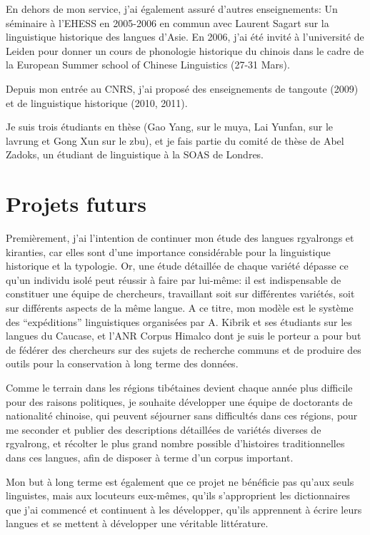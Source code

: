 \documentclass[oldfontcommands,oneside,a4paper,11pt]{memoir}
\begin{document}
En dehors de mon service, j’ai également assuré d’autres enseignements:
Un séminaire à l’EHESS en 2005-2006 en commun avec Laurent Sagart sur la linguistique historique des langues d’Asie.
En 2006, j’ai été invité à l’université de Leiden pour donner un cours de phonologie historique du chinois dans le cadre de la European Summer school of Chinese Linguistics (27-31 Mars).


Depuis mon entrée au CNRS, j'ai proposé des enseignements de tangoute (2009) et de linguistique historique (2010, 2011).

Je suis trois étudiants en thèse (Gao Yang, sur le muya, Lai Yunfan, sur le lavrung et Gong Xun sur le zbu), et je fais partie du comité de thèse de Abel Zadoks, un étudiant de linguistique à la SOAS de Londres.
 


\chapter{Projets futurs}


Premièrement, j'ai l'intention de continuer mon étude des langues rgyalrongs et kiranties, car elles sont d'une importance considérable pour la linguistique historique et la typologie. Or, une étude détaillée de chaque variété dépasse ce qu'un individu isolé peut réussir à faire par lui-même: il est indispensable de constituer une équipe de chercheurs, travaillant soit sur différentes variétés, soit sur différents aspects de la même langue. A ce titre, mon modèle est le système des ``expéditions'' linguistiques organisées par A. Kibrik et ses étudiants sur les langues du Caucase, et l'ANR Corpus Himalco dont je suis le porteur a pour but de fédérer des chercheurs sur des sujets de recherche communs et de produire des outils pour la conservation à long terme des données.

Comme le terrain dans les régions tibétaines devient chaque année plus difficile pour des raisons politiques, je souhaite développer une équipe de doctorants de nationalité chinoise, qui peuvent séjourner sans difficultés dans ces régions, pour me seconder et publier des descriptions détaillées de variétés diverses de rgyalrong, et récolter le plus grand nombre possible d'histoires traditionnelles dans ces langues, afin de disposer à terme d'un corpus important.

Mon but à long terme est également que ce projet ne bénéficie pas qu'aux seuls linguistes, mais aux locuteurs eux-mêmes, qu'ils s'approprient les  dictionnaires que j'ai commencé et continuent à les développer, qu'ils apprennent à écrire leurs langues et se mettent à développer une véritable littérature. 
\end{document}
